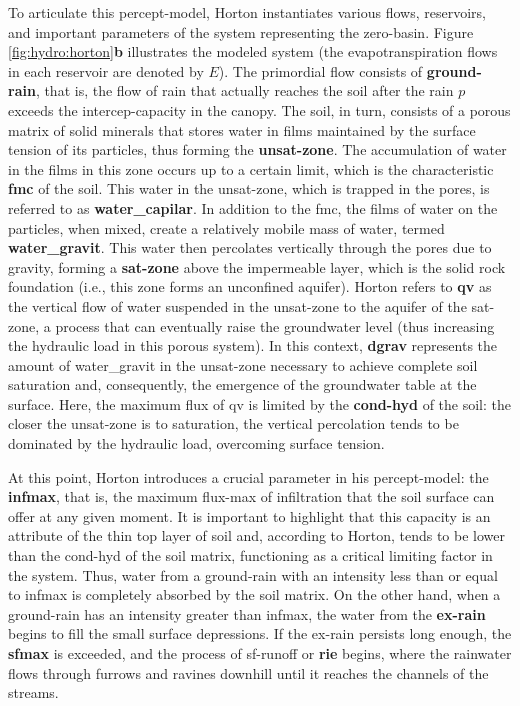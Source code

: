 \documentclass[./main_en.tex]{subfiles}
\begin{document}
\par To articulate this \gls{percept-model}, Horton instantiates various flows, reservoirs, and important \gls{parameters} of the \gls{system} representing the \gls{zero-basin}. Figure \ref{fig:hydro:horton}\textbf{b} illustrates the modeled \gls{system} (the evapotranspiration flows in each reservoir are denoted by $E$). The primordial flow consists of \textbf{\gls{ground-rain}}, that is, the flow of rain that actually reaches the soil after the rain $p$ exceeds the \gls{intercep-capacity} in the \gls{canopy}. The soil, in turn, consists of a porous matrix of solid minerals that stores water in films maintained by the surface tension of its particles, thus forming the \textbf{\gls{unsat-zone}}. The accumulation of water in the films in this zone occurs up to a certain limit, which is the characteristic \textbf{\gls{fmc}} of the soil. This water in the \gls{unsat-zone}, which is trapped in the pores, is referred to as \textbf{\gls{water_capilar}}. In addition to the \gls{fmc}, the films of water on the particles, when mixed, create a relatively mobile mass of water, termed \textbf{\gls{water_gravit}}. This water then percolates vertically through the pores due to gravity, forming a \textbf{\gls{sat-zone}} above the impermeable layer, which is the solid rock foundation (i.e., this zone forms an unconfined aquifer). Horton refers to \textbf{\gls{qv}} as the vertical flow of water suspended in the \gls{unsat-zone} to the aquifer of the \gls{sat-zone}, a process that can eventually raise the groundwater level (thus increasing the hydraulic load in this porous \gls{system}). In this context, \textbf{\gls{dgrav}} represents the amount of \gls{water_gravit} in the \gls{unsat-zone} necessary to achieve complete soil saturation and, consequently, the emergence of the groundwater table at the surface. Here, the maximum flux of \gls{qv} is limited by the \textbf{\gls{cond-hyd}} of the soil: the closer the \gls{unsat-zone} is to saturation, the vertical percolation tends to be dominated by the hydraulic load, overcoming surface tension.

\par At this point, Horton introduces a crucial parameter in his \gls{percept-model}: the \textbf{\gls{infmax}}, that is, the maximum \gls{flux-max} of infiltration that the soil surface can offer at any given moment. It is important to highlight that this capacity is an attribute of the thin top layer of soil and, according to Horton, tends to be lower than the \gls{cond-hyd} of the soil matrix, functioning as a critical limiting factor in the \gls{system}. Thus, water from a \gls{ground-rain} with an intensity less than or equal to \gls{infmax} is completely absorbed by the soil matrix. On the other hand, when a \gls{ground-rain} has an intensity greater than \gls{infmax}, the water from the \textbf{\gls{ex-rain}} begins to fill the small surface depressions. If the \gls{ex-rain} persists long enough, the \textbf{\gls{sfmax}} is exceeded, and the process of \gls{sf-runoff} or \textbf{\gls{rie}} begins, where the rainwater flows through furrows and ravines downhill until it reaches the channels of the streams.
\end{document}
